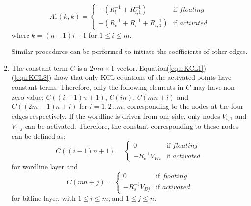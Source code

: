 \begin{enumerate}
    \begin{equation}
    A1(k,k) = \left\{
    \begin{array}{ll}
    -(R_l^{-1}+R_{i,1}^{-1})   & \text{if } floating\\
    -(R_v^{-1}+R_l^{-1}+R_{i,1}^{-1})& \text{if } activated
    \end{array} \right.
    \end{equation}
    where $k=(n-1)i+1$ for $1\leq i\leq m$.

Similar procedures can be performed to initiate the coefficients of
other edges.

\item The constant term $C$ is a $2mn{\times}1$ vector.
    Equation(\ref{equ:KCL1})-(\ref{equ:KCL8}) show that only KCL
    equations of the activated points have constant terms. Therefore,
    only the following elements in $C$ may have non-zero value:
    $C((i-1)n+1)$, $C(in)$, $C(mn+i)$ and $C((2m-1)n+i)$ for
    $i=1,2...m$, corresponding to the nodes at the four edges
    respectively. If the wordline is driven from one side, only nodes
    $V_{i,1}$ and $V_{1,j}$ can be activated. Therefore, the constant
    corresponding to these nodes can be defined as:
\begin{equation}
    C((i-1)n+1) = \left\{
    \begin{array}{ll}
    0   & \text{if } floating\\
    -R_v^{-1}V_{Wi}& \text{if } activated
    \end{array} \right.
    \end{equation}
for wordline layer and
\begin{equation}
    C(mn+j) = \left\{
    \begin{array}{ll}
    0   & \text{if } floating\\
    -R_s^{-1}V_{Bj}& \text{if } activated
    \end{array} \right.
    \end{equation}
for bitline layer, with $1\leq i\leq m$, and $1\leq j\leq n$.
\end{enumerate}
